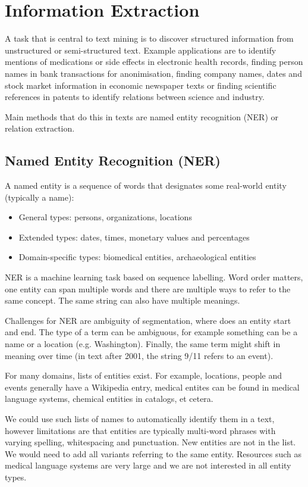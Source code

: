 \section{Information Extraction}

A task that is central to text mining is to discover structured
information from unstructured or semi-structured text. Example
applications are to identify mentions of medications or side effects
in electronic health records, finding person names in bank transactions
for anonimisation, finding company names, dates and stock market information
in economic newspaper texts or finding scientific references in patents
to identify relations between science and industry.

Main methods that do this in texts are named entity recognition (NER)
or relation extraction.

\subsection{Named Entity Recognition (NER)}

A named entity is a sequence of words that designates some real-world
entity (typically a name):
\begin{itemize}
  \item General types: persons, organizations, locations
  \item Extended types: dates, times, monetary values and percentages
  \item Domain-specific types: biomedical entities, archaeological entities
\end{itemize}

NER is a machine learning task based on sequence labelling. Word order matters,
one entity can span multiple words and there are multiple ways to refer to the
same concept. The same string can also have multiple meanings.

Challenges for NER are ambiguity of segmentation, where does an entity
start and end. The type of a term can be ambiguous, for example something
can be a name or a location (e.g. Washington). Finally, the same term might
shift in meaning over time (in text after 2001, the string 9/11 refers to
an event).

For many domains, lists of entities exist. For example, locations, people
and events generally have a Wikipedia entry, medical entites can be found
in medical language systems, chemical entities in catalogs, et cetera.

We could use such lists of names to automatically identify them in a text,
however limitations are that entities are typically multi-word phrases with
varying spelling, whitespacing and punctuation. New entities are not in the
list. We would need to add all variants referring to the same entity. Resources
such as medical language systems are very large and we are not interested in
all entity types.


